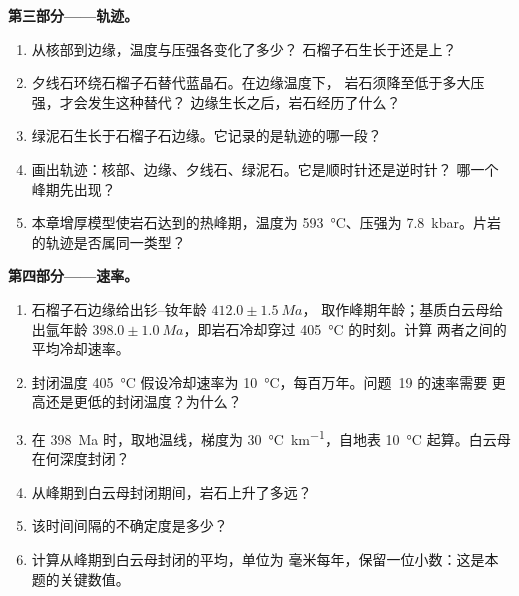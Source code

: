 \begin{problem}
\noindent\textbf{第三部分——轨迹。}
\begin{enumerate}[resume]
\item 从核部到边缘，温度与压强各变化了多少？
石榴子石生长于还是上？
\item 夕线石环绕石榴子石替代蓝晶石。在边缘温度下，
岩石须降至低于多大压强，才会发生这种替代？
边缘生长之后，岩石经历了什么？
\item 绿泥石生长于石榴子石边缘。它记录的是轨迹的哪一段？
\item 画出轨迹：核部、边缘、夕线石、绿泥石。它是顺时针还是逆时针？
哪一个峰期先出现？
\item 本章增厚模型使岩石达到的热峰期，温度为
\qty{593}{\celsius}、压强为 \qty{7.8}{kbar}。片岩的轨迹是否属同一类型？
\end{enumerate}

\noindent\textbf{第四部分——速率。}
\begin{enumerate}[resume]
\item 石榴子石边缘给出钐–钕年龄 $412.0 \pm \qty{1.5}{Ma}$，
取作峰期年龄；基质白云母给出氩年龄 $398.0 \pm
\qty{1.0}{Ma}$，即岩石冷却穿过 \qty{405}{\celsius} 的时刻。计算
两者之间的平均冷却速率。
\item 封闭温度 \qty{405}{\celsius} 假设冷却速率为
\qty{10}{\celsius}，每百万年。问题~19 的速率需要
更高还是更低的封闭温度？为什么？
\item 在 \qty{398}{Ma} 时，取地温线，梯度为
\qty{30}{\celsius\per\km}，自地表 \qty{10}{\celsius} 起算。白云母在何深度封闭？
\item 从峰期到白云母封闭期间，岩石上升了多远？
\item 该时间间隔的不确定度是多少？
\item 计算从峰期到白云母封闭的平均，单位为
毫米每年，保留一位小数：这是本题的关键数值。
\end{enumerate}
\end{problem}
